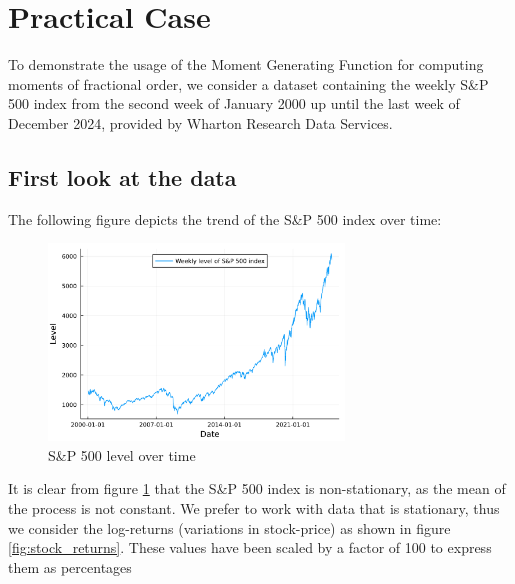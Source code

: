 \section{Practical Case}\label{s:practical_case}
To demonstrate the usage of the Moment Generating Function for computing moments of fractional order, we consider a dataset containing the weekly S\&P 500 index from the second week of January 2000 up until the last week of December 2024, provided by Wharton Research Data Services.
\subsection{First look at the data}
 The following figure depicts the trend of the S\&P 500 index over time:

\begin{figure}[H]
    \centering
    \includegraphics[width=0.7\textwidth]{figures/stock_level.pdf}
    \caption{S\&P 500 level over time}
    \label{fig:stock_level}
\end{figure}
It is clear from figure \ref{fig:stock_level} that the S\&P 500 index is non-stationary, as the mean of the process is not constant. We prefer to work with data that is stationary, thus we consider the log-returns (variations in stock-price) as shown in figure \ref{fig:stock_returns}. These values have been scaled by a factor of 100 to express them as percentages

